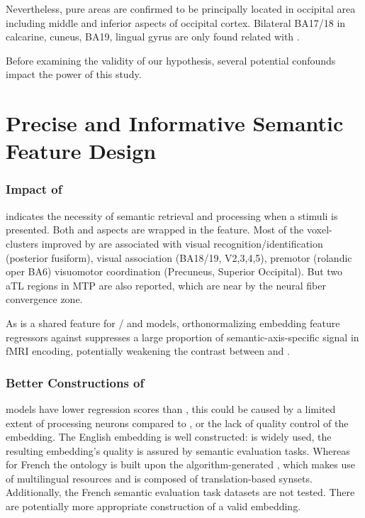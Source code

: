 Nevertheless, pure \association areas are confirmed to be principally located in occipital area including middle and inferior aspects of occipital cortex. Bilateral BA17/18 in calcarine, cuneus, BA19, lingual gyrus are only found related with .

Before examining the validity of our hypothesis, several potential confounds impact the power of this study.

\section{Precise and Informative Semantic Feature Design}

\subsubsection{Impact of }

 indicates the necessity of semantic retrieval and processing when a stimuli is presented. Both \similarity and \association aspects are wrapped in the feature. Most of the voxel-clusters improved by  are associated with visual recognition\slash identification (posterior fusiform), visual association (BA18/19, V2,3,4,5), premotor (rolandic oper BA6) visuomotor coordination (Precuneus, Superior Occipital). But two aTL regions in MTP are also reported, which are near by the neural fiber convergence zone. 

As  is a shared feature for \slash{} and  models, orthonormalizing embedding feature regressors against  suppresses a large proportion of semantic-axis-specific signal in fMRI encoding, potentially weakening the contrast between  and .

\subsubsection{Better Constructions of }

 models have lower regression scores than , this could be caused by a limited extent of \similarity processing neurons compared to \association, or the lack of quality control of the  embedding. The English  embedding is well constructed:  is widely used, the resulting embedding's quality is assured by semantic evaluation tasks. Whereas for French the ontology is built upon the algorithm-generated , which makes use of multilingual resources and is composed of translation-based synsets. Additionally, the French semantic evaluation task datasets are not tested. There are potentially more appropriate construction of a valid \similarity embedding.

